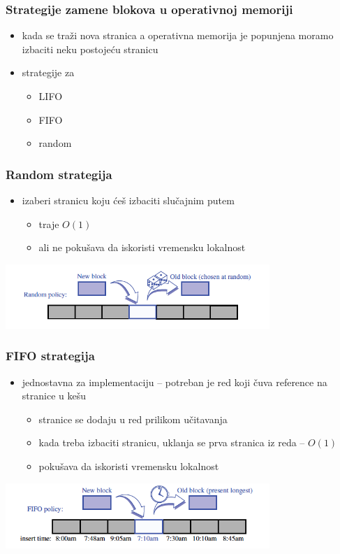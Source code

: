 \documentclass[compress,aspectratio=169]{beamer}
\begin{document}
\begin{frame}[fragile]
  \frametitle{Strategije zamene blokova u operativnoj memoriji}
  \begin{itemize}
    \item kada se traži nova stranica a operativna memorija je popunjena
    moramo izbaciti neku postojeću stranicu
    \item strategije za 
    \begin{itemize}
      \item LIFO
      \item FIFO
      \item random
    \end{itemize}
  \end{itemize}
\end{frame}

\begin{frame}[fragile]
  \frametitle{Random strategija}
  \begin{itemize}
    \item izaberi stranicu koju ćeš izbaciti slučajnim putem
    \begin{itemize}
      \item traje $O(1)$
      \item ali ne pokušava da iskoristi vremensku lokalnost
    \end{itemize}
  \end{itemize}
  \begin{center}
    \includegraphics[width=10cm]{asp-15-pic03.png}
  \end{center}
\end{frame}

\begin{frame}[fragile]
  \frametitle{FIFO strategija}
  \begin{itemize}
    \item jednostavna za implementaciju -- potreban je red koji čuva 
    reference na stranice u kešu
    \begin{itemize}
      \item stranice se dodaju u red prilikom učitavanja
      \item kada treba izbaciti stranicu, uklanja se prva stranica iz 
      reda -- $O(1)$
      \item pokušava da iskoristi vremensku lokalnost
    \end{itemize}
  \end{itemize}
  \begin{center}
    \includegraphics[width=10cm]{asp-15-pic04.png}
  \end{center}
\end{frame}
\end{document}
